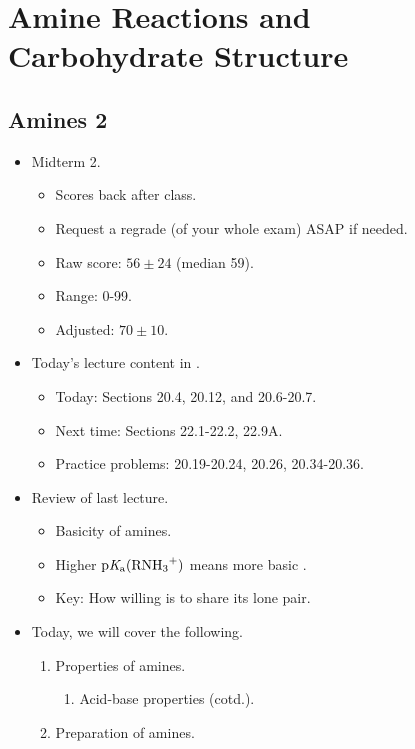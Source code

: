 \documentclass[../notes.tex]{subfiles}
\begin{document}
\chapter{Amine Reactions and Carbohydrate Structure}
\section{Amines 2}
\begin{itemize}
    \item {}Midterm 2.
    \begin{itemize}
        \item Scores back after class.
        \item Request a regrade (of your whole exam) ASAP if needed.
        \item Raw score: $56\pm 24$ (median 59).
        \item Range: 0-99.
        \item Adjusted: $70\pm 10$.
    \end{itemize}
    \item Today's lecture content in \textcite{bib:SolomonsEtAl}.
    \begin{itemize}
        \item Today: Sections 20.4, 20.12, and 20.6-20.7.
        \item Next time: Sections 22.1-22.2, 22.9A.
        \item Practice problems: 20.19-20.24, 20.26, 20.34-20.36.
    \end{itemize}
    \item Review of last lecture.
    \begin{itemize}
        \item Basicity of amines.
        \item Higher $\pKa(\ce{RNH3+})$ means more basic .
        \item Key: How willing is  to share its lone pair.
    \end{itemize}
    \item Today, we will cover the following.
    \begin{enumerate}[label={\Roman*.}]
        \item Properties of amines.
        \begin{enumerate}[label={\Alph*.}]
            \item Acid-base properties (cotd.).
        \end{enumerate}
        \item Preparation of amines.

\end{enumerate}
\end{itemize}
\end{document}
